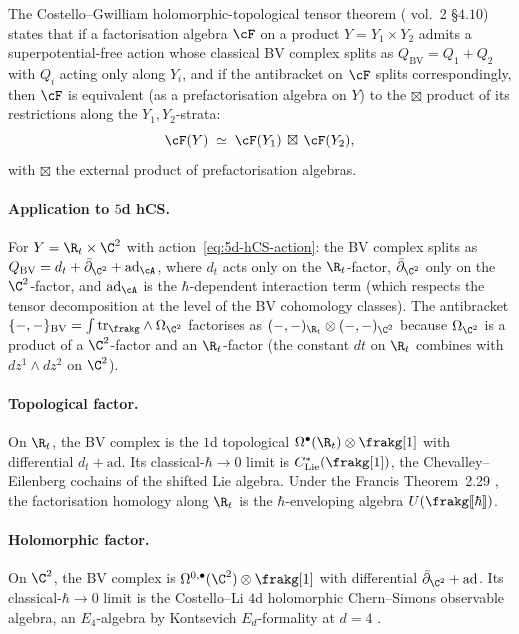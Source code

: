 The Costello--Gwilliam holomorphic-topological tensor theorem
(\cite{CostelloGwilliam} vol.~2 \S$4.10$) states that if a
factorisation algebra $\cF$ on a product $Y = Y_1\times Y_2$ admits a
superpotential-free action whose classical BV complex splits as
$Q_{\mathrm{BV}} = Q_1 + Q_2$ with $Q_i$ acting only along $Y_i$, and if
the antibracket on $\cF$ splits correspondingly, then $\cF$ is
equivalent (as a prefactorisation algebra on $Y$) to the $\boxtimes$
product of its restrictions along the $Y_1, Y_2$-strata:
\[
  \cF(Y) \;\simeq\; \cF(Y_1)\,\boxtimes\, \cF(Y_2),
\]
with $\boxtimes$ the external product of prefactorisation algebras.

\paragraph{Application to $5$d hCS.}
For $Y = \R_t\times\C^2$ with action~\eqref{eq:5d-hCS-action}: the BV
complex splits as
$Q_{\mathrm{BV}} = d_t + \bar\partial_{\C^2} + \mathrm{ad}_{\cA}$,
where $d_t$ acts only on the $\R_t$-factor, $\bar\partial_{\C^2}$
only on the $\C^2$-factor, and $\mathrm{ad}_{\cA}$ is the
$\hbar$-dependent interaction term (which respects the tensor
decomposition at the level of the BV cohomology classes). The
antibracket
$\{-,-\}_{\mathrm{BV}} = \int\mathrm{tr}_\frakg\wedge\Omega_{\C^2}$
factorises as
$(-,-)_{\R_t}\otimes (-,-)_{\C^2}$ because
$\Omega_{\C^2}$ is a product of a $\C^2$-factor and an $\R_t$-factor
(the constant $dt$ on $\R_t$ combines with $dz^1\wedge dz^2$ on $\C^2$).

\paragraph{Topological factor.}
On $\R_t$, the BV complex is the $1$d topological
$\Omega^\bullet(\R_t)\otimes\frakg[1]$ with differential
$d_t + \mathrm{ad}$. Its classical-$\hbar\to 0$ limit is
$C^*_{\mathrm{Lie}}(\frakg[1])$, the Chevalley--Eilenberg cochains
of the shifted Lie algebra. Under the Francis Theorem~2.29
\cite{Francis2013}, the factorisation homology along $\R_t$ is the
$\hbar$-enveloping algebra $U(\frakg[\![\hbar]\!])$.

\paragraph{Holomorphic factor.}
On $\C^2$, the BV complex is
$\Omega^{0,\bullet}(\C^2)\otimes\frakg[1]$ with differential
$\bar\partial_{\C^2} + \mathrm{ad}$. Its classical-$\hbar\to 0$ limit
is the Costello--Li $4$d holomorphic Chern--Simons observable algebra,
an $E_4$-algebra by Kontsevich $E_d$-formality at $d = 4$
\cite{Kontsevich1999}.

